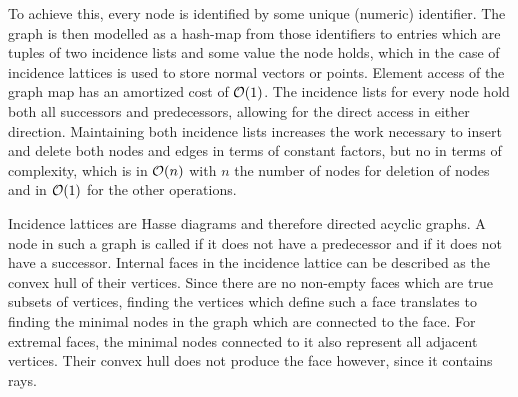 To achieve this, every node is identified by some unique (numeric) identifier.
The graph is then modelled as a hash-map from those identifiers to entries which are tuples of two incidence lists and some value the node holds, which in the case of incidence lattices is used to store normal vectors or points.
Element access of the graph map has an amortized cost of $\mathcal{O}(1)$.
The incidence lists for every node hold both all successors and predecessors, allowing for the direct access in either direction.
Maintaining both incidence lists increases the work necessary to insert and delete both nodes and edges in terms of constant factors, but no in terms of complexity, which is in $\mathcal{O}(n)$ with $n$ the number of nodes for deletion of nodes and in $\mathcal{O}(1)$ for the other operations.

Incidence lattices are Hasse diagrams and therefore directed acyclic graphs.
A node in such a graph is called  if it does not have a predecessor and  if it does not have a successor.
Internal faces in the incidence lattice can be described as the convex hull of their vertices.
Since there are no non-empty faces which are true subsets of vertices, finding the vertices which define such a face translates to finding the minimal nodes in the graph which are connected to the face.
For extremal faces, the minimal nodes connected to it also represent all adjacent vertices.
Their convex hull does not produce the face however, since it contains rays.

